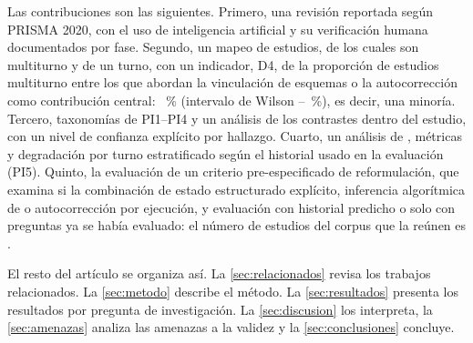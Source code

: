 Las contribuciones son las siguientes. Primero, una revisión reportada según PRISMA 2020, con el uso de inteligencia artificial y su verificación humana documentados por fase. Segundo, un mapeo de \nEstudios{} estudios, de los cuales \nMultiturno{} son multiturno y \nUnTurno{} de un turno, con un indicador, D4, de la proporción de estudios multiturno entre los que abordan la vinculación de esquemas o la autocorrección como contribución central: \DcuatroPct~\% (intervalo de Wilson \DcuatroICinf--\DcuatroICsup~\%), es decir, una minoría. Tercero, taxonomías de PI1–PI4 y un análisis de los contrastes dentro del estudio, con un nivel de confianza explícito por hallazgo. Cuarto, un análisis de , métricas y degradación por turno estratificado según el historial usado en la evaluación (PI5). Quinto, la evaluación de un criterio pre-especificado de reformulación, que examina si la combinación de estado estructurado explícito, inferencia algorítmica de  o autocorrección por ejecución, y evaluación con historial predicho o solo con preguntas ya se había evaluado: el número de estudios del corpus que la reúnen es \nBrechaMocho{}.

El resto del artículo se organiza así. La \cref{sec:relacionados} revisa los trabajos relacionados. La \cref{sec:metodo} describe el método. La \cref{sec:resultados} presenta los resultados por pregunta de investigación. La \cref{sec:discusion} los interpreta, la \cref{sec:amenazas} analiza las amenazas a la validez y la \cref{sec:conclusiones} concluye.
